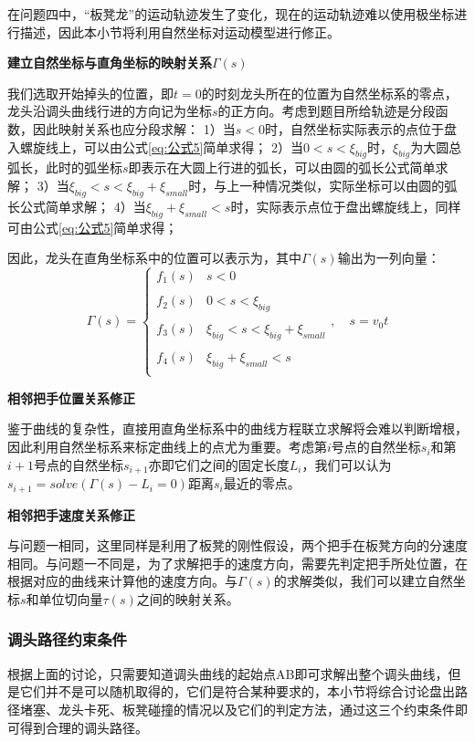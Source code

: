 \documentclass[withoutpreface,bwprint]{cumcmthesis}
\begin{document}
在问题四中，“板凳龙”的运动轨迹发生了变化，现在的运动轨迹难以使用极坐标进行描述，因此本小节将利用自然坐标对运动模型进行修正。

\textbf{建立自然坐标与直角坐标的映射关系$\Gamma (s)$}

我们选取开始掉头的位置，即$t=0$的时刻龙头所在的位置为自然坐标系的零点，龙头沿调头曲线行进的方向记为坐标$s$的正方向。考虑到题目所给轨迹是分段函数，因此映射关系也应分段求解：
1）当$s<0$时，自然坐标实际表示的点位于盘入螺旋线上，可以由公式\cref{eq:公式5}简单求得；
2）当$0<s<\xi _{big}$时，$\xi _{big}$为大圆总弧长，此时的弧坐标$s$即表示在大圆上行进的弧长，可以由圆的弧长公式简单求解；
3）当$\xi _{big}<s<\xi _{big}+\xi _{small}$时，与上一种情况类似，实际坐标可以由圆的弧长公式简单求解；
4）当$\xi _{big}+\xi _{small}<s$时，实际表示点位于盘出螺旋线上，同样可由公式\cref{eq:公式5}简单求得；

因此，龙头在直角坐标系中的位置可以表示为，其中$\Gamma (s)$输出为一列向量：
$$
\Gamma (s)=\left\{\begin{matrix}
  f_1(s)&s<0\\
  & \\
  f_2(s)&0<s<\xi _{big}\\
  & \\
  f_3(s)& \xi _{big}<s<\xi _{big}+\xi _{small}\\
  & \\
  f_4(s)&\xi _{big}+\xi _{small}<s\\
\end{matrix}\right. ,\quad s=v_0t
$$

\textbf{相邻把手位置关系修正}

鉴于曲线的复杂性，直接用直角坐标系中的曲线方程联立求解将会难以判断增根，因此利用自然坐标系来标定曲线上的点尤为重要。考虑第$i$号点的自然坐标$s_i$和第$i+1$号点的自然坐标$s_{i+1}$亦即它们之间的固定长度$L_i$，我们可以认为$s_{i+1}=solve(\Gamma(s)-L_i=0)$距离$s_i$最近的零点。

\textbf{相邻把手速度关系修正}

与问题一相同，这里同样是利用了板凳的刚性假设，两个把手在板凳方向的分速度相同。与问题一不同是，为了求解把手的速度方向，需要先判定把手所处位置，在根据对应的曲线来计算他的速度方向。与$\Gamma(s)$的求解类似，我们可以建立自然坐标$s$和单位切向量$\tau(s)$之间的映射关系。


\subsubsection{调头路径约束条件}

根据上面的讨论，只需要知道调头曲线的起始点AB即可求解出整个调头曲线，但是它们并不是可以随机取得的，它们是符合某种要求的，本小节将综合讨论盘出路径堵塞、龙头卡死、板凳碰撞的情况以及它们的判定方法，通过这三个约束条件即可得到合理的调头路径。
\end{document}
